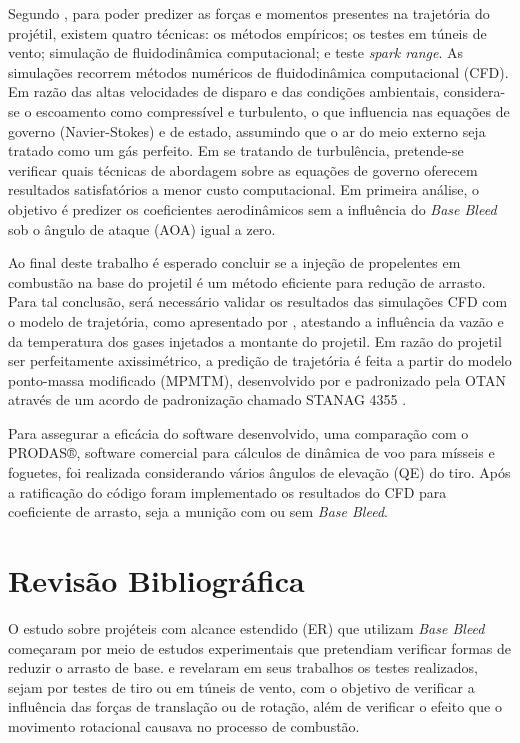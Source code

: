 Segundo \citeauthor{Mahmoud2009}, para poder predizer as forças e momentos presentes na trajetória do projétil, existem quatro técnicas: os métodos empíricos; os testes em túneis de vento; simulação de fluidodinâmica computacional; e teste \textit{spark range}. As simulações recorrem métodos numéricos de fluidodinâmica computacional (CFD). Em razão das altas velocidades de disparo e das condições ambientais, considera-se o escoamento como compressível e turbulento, o que influencia nas equações de governo (Navier-Stokes) e de estado, assumindo que o ar do meio externo seja tratado como um gás perfeito. Em se tratando de turbulência, pretende-se verificar quais técnicas de abordagem sobre as equações de governo oferecem resultados satisfatórios a menor custo computacional. Em primeira análise, o objetivo é predizer os coeficientes aerodinâmicos sem a influência do \textit{Base Bleed} sob o ângulo de ataque (AOA) igual a zero.

Ao final deste trabalho é esperado concluir se a injeção de propelentes em combustão na base do projetil é um método eficiente para redução de arrasto. Para tal conclusão, será necessário validar os resultados das simulações CFD com o modelo de trajetória, como apresentado por \citeauthor{Rosendo2020}, atestando a influência da vazão e da temperatura dos gases injetados a montante do projetil. Em razão do projetil ser perfeitamente axissimétrico, a predição de trajetória é feita a partir do modelo ponto-massa modificado (MPMTM), desenvolvido por \citeauthor{Lieske1966} e padronizado pela OTAN através de um acordo de padronização chamado STANAG 4355 \cite{stanag4355}. 

Para assegurar a eficácia do software desenvolvido, uma comparação com o PRODAS®, software comercial para cálculos de dinâmica de voo para mísseis e foguetes, foi realizada considerando vários ângulos de elevação (QE) do tiro. Após a ratificação do código foram implementado os resultados do CFD para coeficiente de arrasto, seja a munição com ou sem \textit{Base Bleed}. 

\section{Revisão Bibliográfica}

O estudo sobre projéteis com alcance estendido (ER) que utilizam \textit{Base Bleed} começaram por meio de estudos experimentais que pretendiam verificar formas de reduzir o arrasto de base. \citeauthor{Sedney1966} e \citeauthor{Andersson1976} revelaram em seus trabalhos os testes realizados, sejam por testes de tiro ou em túneis de vento, com o objetivo de verificar a influência das forças de translação ou de rotação, além de verificar o efeito que o movimento rotacional causava no processo de combustão.

